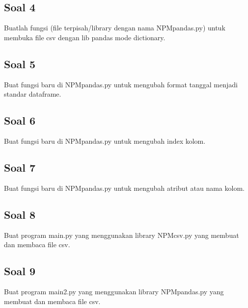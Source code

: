 \subsection{Soal 4}
Buatlah fungsi (file terpisah/library dengan nama NPMpandas.py) untuk membuka file csv dengan lib pandas mode dictionary.



\subsection{Soal 5}
Buat fungsi baru di NPMpandas.py untuk mengubah format tanggal menjadi standar dataframe.



\subsection{Soal 6}
Buat fungsi baru di NPMpandas.py untuk mengubah index kolom.



\subsection{Soal 7}
Buat fungsi baru di NPMpandas.py untuk mengubah atribut atau nama kolom.



\subsection{Soal 8}
Buat program main.py yang menggunakan library NPMcsv.py yang membuat dan membaca file csv.



\subsection{Soal 9}
Buat program main2.py yang menggunakan library NPMpandas.py yang membuat dan membaca file csv.

